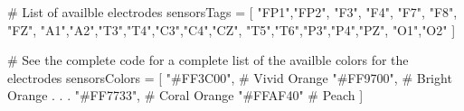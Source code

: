 # List of availble electrodes
sensorsTags = [
	"FP1","FP2",
	"F3", "F4", "F7", "F8", "FZ",
	"A1","A2","T3","T4","C3","C4","CZ",
	"T5","T6","P3","P4","PZ",
	"O1","O2"
]

# See the complete code for a complete list of the availble colors for the electrodes
sensorsColors = [
	"#FF3C00",  # Vivid Orange
	"#FF9700",  # Bright Orange
	.
	.
	.
	"#FF7733",  # Coral Orange
	"#FFAF40"   # Peach
]